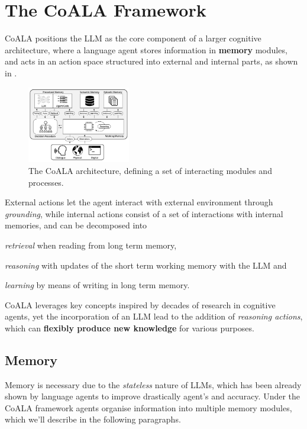 \section{The CoALA Framework}
\ac{CoALA} positions the \ac{LLM} as the core component of a larger cognitive
architecture, where a language agent stores information in \textbf{memory}
modules, and acts in an action space structured into external and internal
parts, as shown in .
%
\begin{figure}[ht]
    \centering
    \includegraphics[width=0.4\textwidth]{img/coala-architecture.png}
    \caption{The \ac{CoALA} architecture, defining a set of interacting modules
    and processes.}
    \label{fig:coala}
\end{figure}
%
External actions let the agent interact with external environment through
\emph{grounding}, while internal actions consist of a set of interactions with
internal memories, and can be decomposed into
\begin{enumerate*}[label=(\emph{\roman{*}})]
    \item \emph{retrieval} when reading from long term memory,
    \item \emph{reasoning} with updates of the short term working memory with
        the \ac{LLM} and
    \item \emph{learning} by means of writing in long term memory.
\end{enumerate*}

\ac{CoALA} leverages key concepts inspired by decades of research in cognitive
agents, yet the incorporation of an \ac{LLM} lead to the addition of
\emph{reasoning actions}, which can \textbf{flexibly produce new knowledge} for
various purposes.

\subsection{Memory}
Memory is necessary due to the \emph{stateless} nature of \ac{LLM}s, which has
been already shown by language agents to improve drastically agent's and
accuracy. Under the \ac{CoALA} framework agents organise information into
multiple memory modules, which we'll describe in the following paragraphs.

